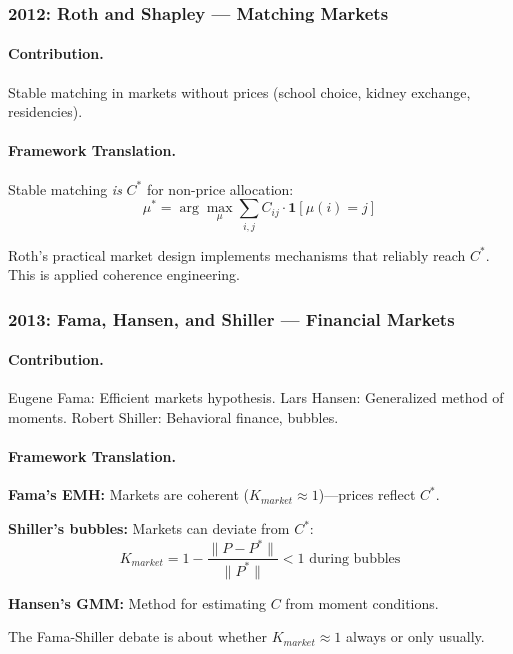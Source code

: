 \subsubsection{2012: Roth and Shapley --- Matching Markets}

\paragraph{Contribution.}
Stable matching in markets without prices (school choice, kidney exchange, residencies).

\paragraph{Framework Translation.}
Stable matching \emph{is} $C^*$ for non-price allocation:
\begin{equation}
  \mu^* = \arg\max_\mu \sum_{i,j} C_{ij} \cdot \mathbf{1}[\mu(i) = j]
\end{equation}

Roth's practical market design implements mechanisms that reliably reach $C^*$.
This is applied coherence engineering.

\subsubsection{2013: Fama, Hansen, and Shiller --- Financial Markets}

\paragraph{Contribution.}
Eugene Fama: Efficient markets hypothesis.
Lars Hansen: Generalized method of moments.
Robert Shiller: Behavioral finance, bubbles.

\paragraph{Framework Translation.}
\textbf{Fama's EMH:} Markets are coherent ($K_{market} \approx 1$)---prices reflect $C^*$.

\textbf{Shiller's bubbles:} Markets can deviate from $C^*$:
\begin{equation}
  K_{market} = 1 - \frac{\|P - P^*\|}{\|P^*\|} < 1 \text{ during bubbles}
\end{equation}

\textbf{Hansen's GMM:} Method for estimating $C$ from moment conditions.

The Fama-Shiller debate is about whether $K_{market} \approx 1$ always or only usually.

